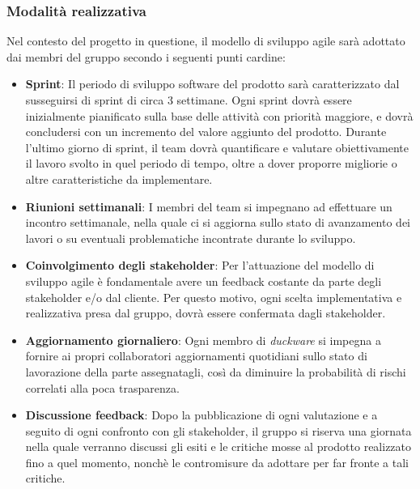 \subsubsection{Modalità realizzativa}
Nel contesto del progetto in questione, il modello di sviluppo agile sarà adottato dai membri del gruppo secondo i seguenti punti cardine:
\begin{itemize}
	\item \textbf{Sprint}: Il periodo di sviluppo software del prodotto sarà caratterizzato dal susseguirsi di sprint di circa 3 settimane. Ogni sprint dovrà essere inizialmente pianificato sulla base delle attività con priorità maggiore, e dovrà concludersi con un incremento del valore aggiunto del prodotto. Durante l'ultimo giorno di sprint, il team dovrà quantificare e valutare obiettivamente il lavoro svolto in quel periodo di tempo, oltre a dover proporre migliorie o altre caratteristiche da implementare. 
	\item \textbf{Riunioni settimanali}: I membri del team si impegnano ad effettuare un incontro settimanale, nella quale ci si aggiorna sullo stato di avanzamento dei lavori o su eventuali problematiche incontrate durante lo sviluppo.
	\item \textbf{Coinvolgimento degli stakeholder}: Per l'attuazione del modello di sviluppo agile è fondamentale avere un feedback costante da parte degli stakeholder e/o dal cliente. Per questo motivo, ogni scelta implementativa e realizzativa presa dal gruppo, dovrà essere confermata dagli stakeholder.
	\item \textbf{Aggiornamento giornaliero}: Ogni membro di \emph{duckware} si impegna a fornire ai propri collaboratori aggiornamenti quotidiani sullo stato di lavorazione della parte assegnatagli, così da diminuire la probabilità di rischi correlati alla poca trasparenza.
	\item \textbf{Discussione feedback}: Dopo la pubblicazione di ogni valutazione e a seguito di ogni confronto con gli stakeholder, il gruppo si riserva una giornata nella quale verranno discussi gli esiti e le critiche mosse al prodotto realizzato fino a quel momento, nonchè le contromisure da adottare per far fronte a tali critiche. 
\end{itemize}